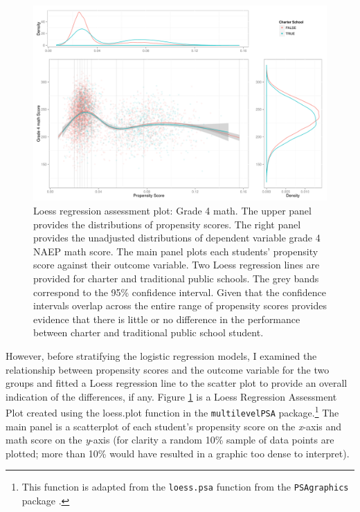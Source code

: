 \documentclass[letterpaper,12p,twoside]{article} %
\begin{document}
\begin{figure}[t]
\begin{center}
\includegraphics[width=\textwidth]{../Figures2009/g4math-loess.pdf}
\caption[Loess regression assessment plot: Grade 4 math]{Loess regression assessment plot: Grade 4 math. The upper panel provides the distributions of propensity scores. The right panel provides the unadjusted distributions of dependent variable grade 4 NAEP math score. The main panel plots each students' propensity score against their outcome variable. Two Loess regression lines are provided for charter and traditional public schools. The grey bands correspond to the 95\% confidence interval. Given that the confidence intervals overlap across the entire range of propensity scores provides evidence that there is little or no difference in the performance between charter and traditional public school student.}
\label{fig:g4math:loess}
\end{center}
\end{figure}

However, before stratifying the logistic regression models, I examined the relationship between propensity scores and the outcome variable for the two groups and fitted a Loess regression line to the scatter plot to provide an overall indication of the differences, if any. Figure \ref{fig:g4math:loess} is a Loess Regression Assessment Plot created using the loess.plot function in the \texttt{multilevelPSA} package.\footnote{This function is adapted from the \texttt{loess.psa} function from the \texttt{PSAgraphics} package \cite{HelmreichPruzek2009}.} The main panel is a scatterplot of each student's propensity score on the \textit{x}-axis and math score on the \textit{y}-axis (for clarity a random 10\% sample of data points are plotted; more than 10\% would have resulted in a graphic too dense to interpret). 
\end{document}
